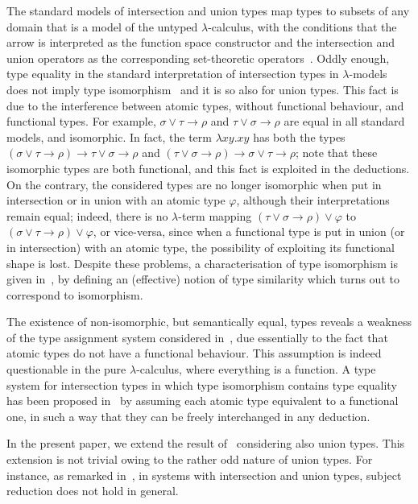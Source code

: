 \documentclass[UKenglish]{eptcs}
\newcommand{\tA}{\sigma}       \newcommand{\tB}{\tau}
\newcommand{\tC}{\rho}
\begin{document}
 The standard models of intersection and union types map types to subsets of any domain that is a model of the untyped $\lambda$-calculus, with the conditions that the arrow is interpreted as the function space constructor and the intersection and union operators as the corresponding set-theoretic operators~\cite{barba}.
Oddly enough,
type equality in the standard interpretation of intersection types in $\lambda$-models
does not imply type isomorphism~\cite{DDGT10} and it is so also for union types.
This fact is due to the interference between atomic types, without functional behaviour, and functional types. For example, $\tA\vee\tB\to\tC$ and $\tB\vee\tA\to\tC$ are equal in all standard models, and isomorphic. In fact, the term $\lambda xy.xy$ has both the types $(\tA\vee\tB\to\tC)\to\tB\vee\tA\to\tC$ and $(\tB\vee\tA\to\tC)\to\tA\vee\tB\to\tC$; note that these isomorphic types are both functional, and this fact is exploited in the deductions. On the contrary, the considered types are no longer
isomorphic when put in intersection or in union
with an atomic type $\varphi$, although their interpretations remain equal;
indeed, there is no $\lambda$-term mapping $(\tB\vee\tA\to\tC)\vee\varphi$ to $(\tA\vee\tB\to\tC)\vee\varphi$, or vice-versa, since when a functional type is put in union (or in intersection) with an atomic type, the possibility of exploiting its functional shape is lost.
Despite these problems,  a characterisation of type isomorphism
is given in~\cite{CDMZ13a}, by defining an (effective) notion of type similarity which turns out to correspond to isomorphism.

The existence of non-isomorphic, but semantically equal, types
reveals a weakness of the type assignment system considered in~\cite{CDMZ13a}, due essentially to the fact that atomic types do not have a  functional behaviour.
This assumption is indeed questionable in the pure $\lambda$-calculus, where everything is a function.
A type system for intersection types in which type isomorphism contains type equality has been proposed in~\cite{CDMZ14} by assuming each atomic type equivalent to a functional one, in such a way that they can be freely interchanged in any deduction.

In the present paper, we extend
the result of~\cite{CDMZ14} considering also union types.
This extension is not trivial owing to the rather odd nature of union types. For instance, as remarked in~\cite{barba}, in systems with intersection and union types, subject reduction does not hold in general.
\end{document}
